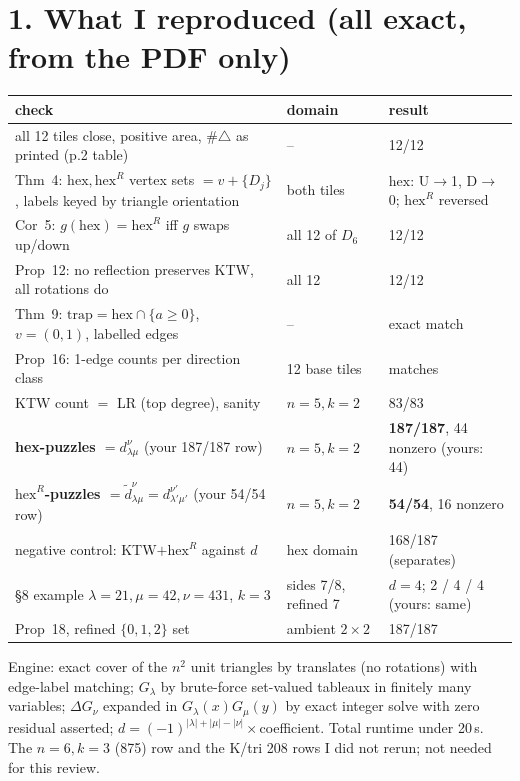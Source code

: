 \documentclass[11pt]{article}
\newcommand{\hexR}{\mathrm{hex}^{R}}
\newcommand{\hex}{\mathrm{hex}}
\begin{document}
\section*{1. What I reproduced (all exact, from the PDF only)}
{\small\begin{tabular}{@{}p{8.4cm}p{3.0cm}p{4.6cm}@{}}\toprule
check & domain & result\\\midrule
all 12 tiles close, positive area, \#$\triangle$ as printed (p.2 table) & -- & 12/12\\
Thm~4: $\hex,\hexR$ vertex sets $=v+\{D_j\}$, labels keyed by triangle orientation & both tiles & $\hex$: U$\to$1, D$\to$0; $\hexR$ reversed\\
Cor~5: $g(\hex)=\hexR$ iff $g$ swaps up/down & all 12 of $D_6$ & 12/12\\
Prop~12: no reflection preserves KTW, all rotations do & all 12 & 12/12\\
Thm~9: $\mathrm{trap}=\hex\cap\{a\ge0\}$, $v=(0,1)$, labelled edges & -- & exact match\\
Prop~16: 1-edge counts per direction class & 12 base tiles & matches\\
KTW count $=$ LR (top degree), sanity & $n{=}5,k{=}2$ & 83/83\\
\textbf{hex-puzzles $= d^\nu_{\lambda\mu}$} (your 187/187 row) & $n{=}5,k{=}2$ & \textbf{187/187}, 44 nonzero (yours: 44)\\
\textbf{$\hexR$-puzzles $=\tilde d^\nu_{\lambda\mu}=d^{\nu'}_{\lambda'\mu'}$} (your 54/54 row) & $n{=}5,k{=}2$ & \textbf{54/54}, 16 nonzero\\
negative control: KTW$+\hexR$ against $d$ & hex domain & 168/187 (separates)\\
\S8 example $\lambda=21,\mu=42,\nu=431$, $k=3$ & sides 7/8, refined 7 & $d=4$; 2 / 4 / 4 (yours: same)\\
Prop~18, refined $\{0,1,2\}$ set & ambient $2\times2$ & 187/187\\\bottomrule
\end{tabular}}

Engine: exact cover of the $n^2$ unit triangles by translates (no rotations) with edge-label matching; $G_\lambda$ by brute-force set-valued tableaux in finitely many variables; $\Delta G_\nu$ expanded in $G_\lambda(x)G_\mu(y)$ by exact integer solve with zero residual asserted; $d=(-1)^{|\lambda|+|\mu|-|\nu|}\times$coefficient. Total runtime under 20\,s. The $n=6,k=3$ (875) row and the K/tri 208 rows I did not rerun; not needed for this review.
\end{document}
